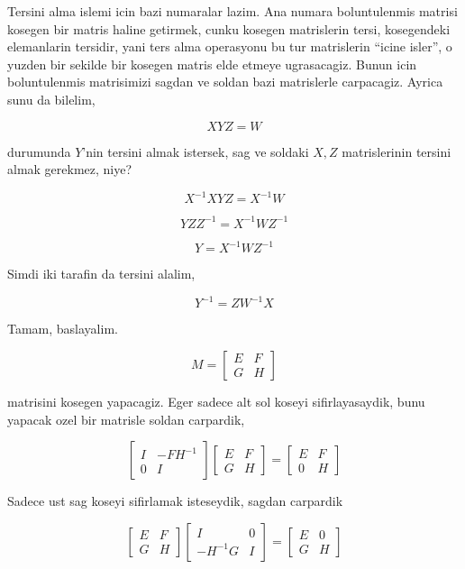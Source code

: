 \documentclass[12pt,fleqn]{article}\usepackage{../common}
\begin{document}
Tersini alma islemi icin bazi numaralar lazim. Ana numara boluntulenmis matrisi 
kosegen bir matris haline getirmek, cunku kosegen matrislerin tersi,
kosegendeki elemanlarin tersidir, yani ters alma operasyonu bu tur
matrislerin ``icine isler'', o yuzden bir sekilde bir kosegen matris
elde etmeye ugrasacagiz. Bunun icin boluntulenmis matrisimizi sagdan ve
soldan bazi matrislerle carpacagiz. Ayrica sunu da bilelim, 

\[ XYZ = W \]

durumunda $Y$'nin tersini almak istersek, sag ve soldaki $X,Z$
matrislerinin tersini almak gerekmez, niye?

\[ X^{-1}XYZ = X^{-1}W \]

\[ YZZ^{-1} = X^{-1}WZ^{-1} \]

\[ Y = X^{-1}WZ^{-1} \]

Simdi iki tarafin da tersini alalim, 

\[ Y^{-1} = ZW^{-1}X \]

Tamam, baslayalim. 

\[ M = 
\left[\begin{array}{rr}
E & F \\
G & H
\end{array}\right] 
 \]

matrisini kosegen yapacagiz. Eger sadece alt sol koseyi sifirlayasaydik, 
bunu yapacak ozel bir matrisle soldan carpardik,

\[ 
\left[\begin{array}{rr}
I & -FH^{-1} \\
0 & I
\end{array}\right] 
\left[\begin{array}{rr}
E & F \\
G & H
\end{array}\right] = 
\left[\begin{array}{rr}
E & F \\
0 & H
\end{array}\right] 
 \]

Sadece ust sag koseyi sifirlamak isteseydik, sagdan carpardik

\[ 
\left[\begin{array}{rr}
E & F \\
G & H
\end{array}\right] 
\left[\begin{array}{rr}
I & 0 \\
-H^{-1}G & I
\end{array}\right] 
=
\left[\begin{array}{rr}
E & 0 \\
G & H
\end{array}\right] 
 \]
\end{document}
